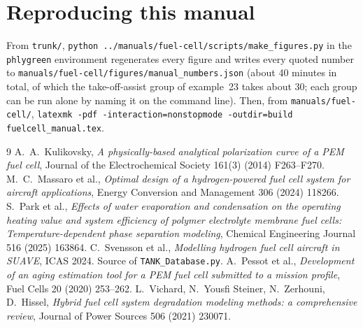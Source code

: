 \documentclass[a4paper,11pt]{article}
\newcommand{\code}[1]{\nolinkurl{#1}}
\newcommand{\fn}[1]{\nolinkurl{#1}}
\begin{document}
\section*{Reproducing this manual}

From \fn{trunk/}, \code{python ../manuals/fuel-cell/scripts/make_figures.py} in the \code{phlygreen} environment
regenerates every figure and writes every quoted number to
\fn{manuals/fuel-cell/figures/manual_numbers.json} (about 40 minutes in total, of which the take-off-assist group of example~23 takes about 30; each group can be run alone by naming it on the command line). Then, from
\fn{manuals/fuel-cell/}, \code{latexmk -pdf -interaction=nonstopmode -outdir=build fuelcell_manual.tex}.



\begin{thebibliography}{9}
 A.~A.~Kulikovsky, \emph{A physically-based analytical polarization curve
of a PEM fuel cell}, Journal of the Electrochemical Society 161(3) (2014) F263--F270. 
 M.~C.~Massaro et al., \emph{Optimal design of a hydrogen-powered fuel cell
system for aircraft applications}, Energy Conversion and Management 306 (2024) 118266.
 S.~Park et al., \emph{Effects of water evaporation and condensation on 
the operating heating value and system efficiency of polymer electrolyte membrane
fuel cells: Temperature-dependent phase separation modeling}, Chemical Engineering Journal 516 (2025) 163864.
 C.~Svensson et al., \emph{Modelling hydrogen fuel cell aircraft in SUAVE},
ICAS 2024. Source of \fn{TANK_Database.py}.
 A.~Pessot et al., \emph{Development of an aging estimation tool for a PEM
fuel cell submitted to a mission profile}, Fuel Cells 20 (2020) 253--262. 
 L.~Vichard, N.~Yousfi Steiner, N.~Zerhouni, D.~Hissel, \emph{Hybrid fuel cell
system degradation modeling methods: a comprehensive review}, Journal of Power Sources 506
(2021) 230071.
\end{thebibliography}
\end{document}
